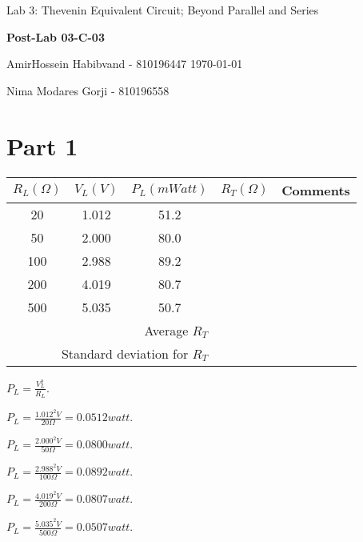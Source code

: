 \documentclass{report}
\begin{document}
    {\large Lab 3: Thevenin Equivalent Circuit; Beyond Parallel and Series }
    \hfill
    {\large \textbf{Post-Lab 03-C-03} \par}
	\vspace{0.1in}
    {\large AmirHossein Habibvand - 810196447}
    \hfill
    \today \par
    {\large Nima Modares Gorji - 810196558 \par}
	\vspace{0.5in}

    \section*{Part 1}
    \begin{multicols}{2}\setlength{\columnseprule}{0pt}
        \begin{center}
            \scalebox{0.8}
            {
                \renewcommand{\arraystretch}{1.2} %
                \begin{tabular}{|c|c|c|c|c|}
                    \hline
                    \textbf{$R_L(\Omega)$} & \textbf{$V_L(V)$} & \textbf{$P_L(mWatt)$} & \textbf{$R_T(\Omega)$} & \textbf{Comments} \\
                    \hline
                    20  & 1.012 & 51.2 & & \\
                    50  & 2.000 & 80.0 & & \\
                    100 & 2.988 & 89.2 & & \\
                    200 & 4.019 & 80.7 & & \\
                    500 & 5.035 & 50.7 & & \\
                    \hline
                    \multicolumn{3}{|r|}{Average $R_T$} & & \\
                    \hline
                    \multicolumn{3}{|r|}{Standard deviation for $R_T$} & & \\
                    \hline
                \end{tabular}
            }
        \end{center}
        \vfill\null
        \columnbreak
        {
            $P_L = \frac{V_L^2}{R_L}$.

            $P_L = \frac{1.012^2 V}{20\Omega}  = 0.0512 watt$.

            $P_L = \frac{2.000^2 V}{50\Omega}  = 0.0800 watt$.

            $P_L = \frac{2.988^2 V}{100\Omega} = 0.0892 watt$.

            $P_L = \frac{4.019^2 V}{200\Omega} = 0.0807 watt$.

            $P_L = \frac{5.035^2 V}{500\Omega} = 0.0507 watt$.

        }
    \end{multicols}
\end{document}
